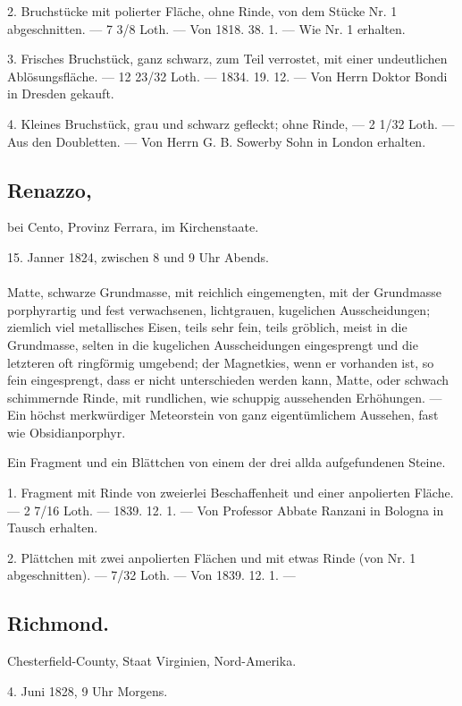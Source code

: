\documentclass[a4paper, 11pt, oneside, polutonikogreek, german]{article}
\begin{document}
2. Bruchstücke mit polierter Fläche, ohne Rinde, von dem Stücke Nr. 1 abgeschnitten. — 7 3/8 Loth. — Von 1818. 38. 1. — Wie Nr. 1 erhalten.

3. Frisches Bruchstück, ganz schwarz, zum Teil verrostet, mit einer undeutlichen Ablösungsfläche. — 12 23/32 Loth. — 1834. 19. 12. — Von Herrn Doktor Bondi in Dresden gekauft.

4. Kleines Bruchstück, grau und schwarz gefleckt; ohne Rinde, — 2 1/32 Loth. — Aus den Doubletten. — Von Herrn G. B. Sowerby Sohn in London erhalten.
\subsection[Renazzo.]{Renazzo,}
\begin{center}
\small
bei Cento, Provinz Ferrara, im Kirchenstaate.

15. Janner 1824, zwischen 8 und 9 Uhr Abends.
\end{center}
\paragraph{}
Matte, schwarze Grundmasse, mit reichlich eingemengten, mit der Grundmasse porphyrartig und fest verwachsenen, lichtgrauen, kugelichen Ausscheidungen; ziemlich viel metallisches Eisen, teils sehr fein, teils gröblich, meist in die Grundmasse, selten in die kugelichen Ausscheidungen eingesprengt und die letzteren oft ringförmig umgebend; der Magnetkies, wenn er vorhanden ist, so fein eingesprengt, dass er nicht unterschieden werden kann, Matte, oder schwach schimmernde Rinde, mit rundlichen, wie schuppig aussehenden Erhöhungen. — Ein höchst merkwürdiger Meteorstein von ganz eigentümlichem Aussehen, fast wie Obsidianporphyr.

Ein Fragment und ein Blättchen von einem der drei allda aufgefundenen Steine.

1. Fragment mit Rinde von zweierlei Beschaffenheit und einer anpolierten Fläche. — 2 7/16 Loth. — 1839. 12. 1. — Von Professor Abbate Ranzani in Bologna in Tausch erhalten.

2. Plättchen mit zwei anpolierten Flächen und mit etwas Rinde (von Nr. 1 abgeschnitten). — 7/32 Loth. — Von 1839. 12. 1. —
\subsection{Richmond.}
\begin{center}
\small
Chesterfield-County, Staat Virginien, Nord-Amerika.

4. Juni 1828, 9 Uhr Morgens.
\end{center}
\end{document}

